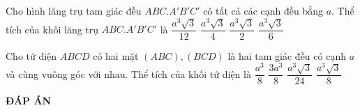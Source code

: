 \begin{ex}%
Cho hình lăng trụ tam giác đều $ABC.A'B'C'$ có tất cả các cạnh đều bằng $a$. Thể tích của khối lăng trụ $ABC.A'B'C'$ là
\choice
{$\dfrac{a^3\sqrt{3}}{12}$}
{\True $\dfrac{a^3\sqrt{3}}{4}$}
{$\dfrac{a^3\sqrt{3}}{2}$}
{$\dfrac{a^3\sqrt{3}}{6}$}
\end{ex}

\begin{ex}%
Cho tứ diện $ABCD$ có hai mặt $(ABC),(BCD)$ là hai tam giác đều có cạnh $a$ và cùng vuông góc với nhau. Thể tích của khối tứ diện là
\choice
{\True $\dfrac{a^3}{8}$}
{$\dfrac{3a^3}{8}$}
{$\dfrac{a^3\sqrt{3}}{24}$}
{$\dfrac{a^3\sqrt{3}}{8}$}  
\end{ex}
\newpage
\begin{center}
	\textbf{ĐÁP ÁN}
\end{center}
\begin{multicols}{10}
	 
\end{multicols}
